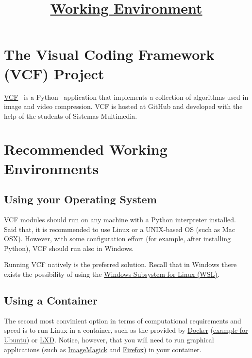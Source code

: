 

\title{\href{https://sistemas-multimedia.github.io/contents/working_environment/}{Working Environment}}

\maketitle

\tableofcontents

\section{The Visual Coding Framework (VCF) Project}
\href{https://github.com/Sistemas-Multimedia/VCF}{VCF}~\cite{vruiz__VCF}
is a Python~\cite{python} application that implements a collection of
algorithms used in image and video compression. VCF is hosted at
GitHub and developed with the help of the students of Sistemas
Multimedia.

\section{Recommended Working Environments}

\subsection{Using your Operating System}
VCF modules should run on any machine with a Python interpreter
installed. Said that, it is recommended to use Linux or a
UNIX-based OS (such as Mac OSX). However, with some configuration effort
(for example, after installing Python), VCF should run also in
Windows.

Running VCF natively is the preferred solution. Recall that in Windows
there exists the possibility of using the
\href{https://learn.microsoft.com/en-us/windows/wsl/install}{Windows
  Subsystem for Linux (WSL)}.

\subsection{Using a Container}
The second most convinient option in terms of computational
requirements and speed is to run Linux in a container, such
as the provided by \href{https://hub.docker.com/}{Docker}
(\href{https://hub.docker.com/_/ubuntu}{example for Ubuntu})
or \href{https://linuxcontainers.org/}{LXD}. Notice, however, that you
will need to run graphical applications (such
as \href{https://linuxcontainers.org/}{ImageMagick}
and \href{https://www.mozilla.org/firefox}{Firefox}) in your
container.

